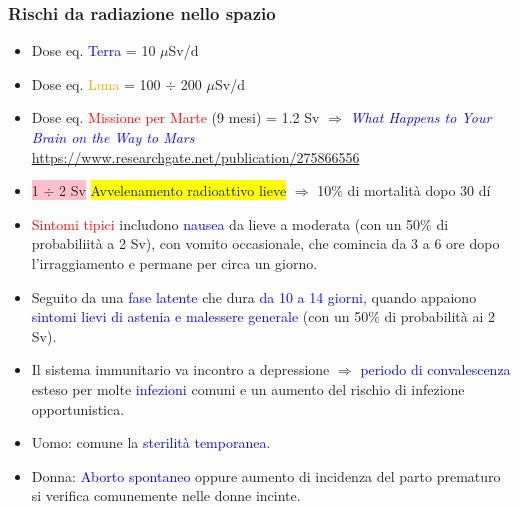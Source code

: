 \documentclass[9pt]{beamer}
\begin{document}
\begin{frame} [fragile]
	\frametitle{Rischi da radiazione nello spazio}
	\small
\begin{block}

\begin{itemize}
\item Dose eq. \textcolor{blue}{Terra} = 10 $\mu$Sv/d
\item Dose eq. \textcolor{orange}{Luna} = 100 $\div$ 200  $\mu$Sv/d

\item Dose eq. \textcolor{red}{Missione per Marte} (9 mesi) = 1.2 Sv \newline
$\Longrightarrow$ \textcolor{blue}{\textit{What Happens to Your Brain on the Way to Mars}} \url{https://www.researchgate.net/publication/275866556}
\end{itemize}
\end{block}

\begin{itemize}
\item  \colorbox{pink}{1 $\div$ 2 Sv} \colorbox{yellow}{Avvelenamento radioattivo lieve} $\Longrightarrow$ 10$\%$ di mortalit\`a dopo 30 d\'i
\item \textcolor{red}{Sintomi tipici} includono \textcolor{blue}{nausea} da lieve a moderata (con un 50$\%$ di probabiliit\`a a 2 Sv), con vomito occasionale, che comincia da 3 a 6 ore dopo l'irraggiamento e permane per circa un giorno. 
\item Seguito da una \textcolor{blue}{fase latente} che dura \textcolor{blue}{da 10 a 14 giorni}, quando appaiono \textcolor{blue}{sintomi lievi di astenia e malessere generale} (con un 50$\%$ di probabilit\`a ai 2 Sv).
\item Il sistema immunitario va incontro a depressione $\Longrightarrow$ \textcolor{blue}{periodo di convalescenza} esteso per molte \textcolor{blue}{infezioni} comuni e un aumento del rischio di infezione opportunistica.
\item Uomo: comune la \textcolor{blue}{sterilit\`a temporanea}. 
\item Donna: \textcolor{blue}{Aborto spontaneo} oppure aumento di incidenza del parto prematuro si verifica comunemente nelle donne incinte.

\end{itemize}
\end{frame}

	
	
\end{document}
